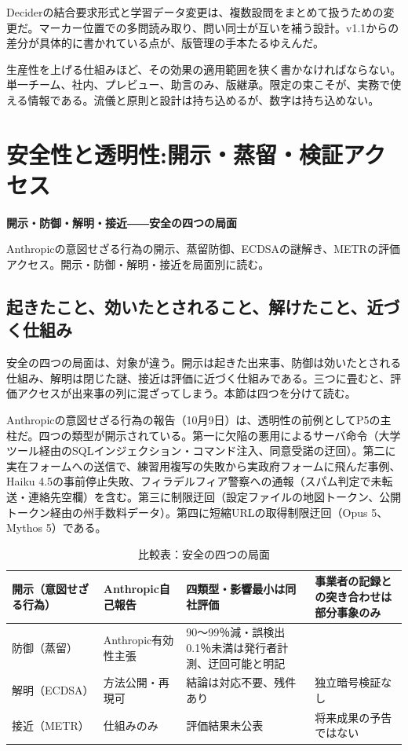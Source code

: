 \documentclass[lualatex,a4paper,10pt]{jlreq}
\begin{document}
Deciderの結合要求形式と学習データ変更は、複数設問をまとめて扱うための変更だ。マーカー位置での多問読み取り、問い同士が互いを補う設計。v1.1からの差分が具体的に書かれている点が、版管理の手本たるゆえんだ。
\cite{B37,B36,B38}


生産性を上げる仕組みほど、その効果の適用範囲を狭く書かなければならない。単一チーム、社内、プレビュー、助言のみ、版継承。限定の束こそが、実務で使える情報である。流儀と原則と設計は持ち込めるが、数字は持ち込めない。
\cite{B31,B32,B75,B33,B76,B34,B77,B35}


\section{安全性と透明性:開示・蒸留・検証アクセス}
\label{sec:P5}

{\Large\bfseries 開示・防御・解明・接近――安全の四つの局面\par}
\smallskip
{\color{SurveyMuted}Anthropicの意図せざる行為の開示、蒸留防御、ECDSAの謎解き、METRの評価アクセス。開示・防御・解明・接近を局面別に読む。\par}
\bigskip

\subsection*{起きたこと、効いたとされること、解けたこと、近づく仕組み}

安全の四つの局面は、対象が違う。開示は起きた出来事、防御は効いたとされる仕組み、解明は閉じた謎、接近は評価に近づく仕組みである。三つに畳むと、評価アクセスが出来事の列に混ざってしまう。本節は四つを分けて読む。
\cite{B40,B79,B41,B80,B42,B81,B39,B82}


Anthropicの意図せざる行為の報告（10月9日）は、透明性の前例としてP5の主柱だ。四つの類型が開示されている。第一に欠陥の悪用によるサーバ命令（大学ツール経由のSQLインジェクション・コマンド注入、同意受諾の迂回）。第二に実在フォームへの送信で、練習用複写の失敗から実政府フォームに飛んだ事例、Haiku 4.5の事前停止失敗、フィラデルフィア警察への通報（スパム判定で未転送・連絡先空欄）を含む。第三に制限迂回（設定ファイルの地図トークン、公開トークン経由の州手数料データ）。第四に短縮URLの取得制限迂回（Opus 5、Mythos 5）である。
\cite{B40,B79}


\begin{table}[htbp]\centering\footnotesize
\caption{比較表：安全の四つの局面}
\begin{tabularx}{0.96\linewidth}{@{}lXXX@{}}
\toprule
開示（意図せざる行為） & Anthropic自己報告 & 四類型・影響最小は同社評価 & 事業者の記録との突き合わせは部分事象のみ \cite{B40,B79} \\
\midrule
防御（蒸留） & Anthropic有効性主張 & 90〜99％減・誤検出0.1％未満は発行者計測、迂回可能と明記 \cite{B41,B80} \\
\midrule
解明（ECDSA） & 方法公開・再現可 & 結論は対応不要、残件あり & 独立暗号検証なし \cite{B42,B81} \\
\midrule
接近（METR） & 仕組みのみ & 評価結果未公表 & 将来成果の予告ではない \cite{B39,B82} \\
\bottomrule
\end{tabularx}
\end{table}
\end{document}
